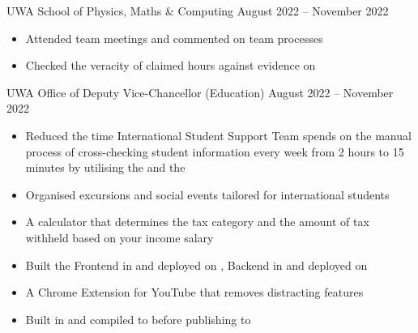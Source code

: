 \documentclass[paper=a4,fontsize=10pt]{resume}
\begin{document}
{		\divider

			{UWA School of Physics, Maths \& Computing}
			{August 2022 -- November 2022}
		\begin{itemize}
			\item Attended team meetings and commented on team processes
			\item Checked the veracity of claimed hours against evidence on 
		\end{itemize}

		\divider

			{UWA Office of Deputy Vice-Chancellor (Education)}
			{August 2022 -- November 2022}
		\begin{itemize}
			\item Reduced the time International Student Support Team spends on the manual process of cross-checking student information every week from 2 hours to 15 minutes by utilising the  and the 
			\item Organised excursions and social events tailored for international students
		\end{itemize}

		\begin{itemize}
			\item A calculator that determines the tax category and the amount of tax withheld based on your income salary
			\item Built the Frontend in  and deployed on , Backend in  and deployed on 
		\end{itemize}

		\divider

		\begin{itemize}
			\item A Chrome Extension for YouTube that removes distracting features
			\item Built in  and compiled to  before publishing to 
		\end{itemize}
}

\makebody
\end{document}
